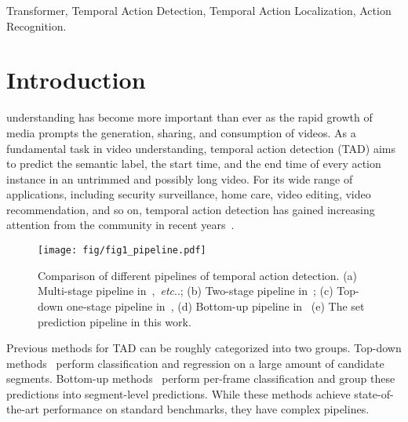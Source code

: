\documentclass[lettersize,journal]{IEEEtran}
\makeatletter
\DeclareRobustCommand\onedot{\futurelet\@let@token\@onedot}
\def\@onedot{\ifx\@let@token.\else.\null\fi\xspace}
\def\etc{\emph{etc}\onedot} \def\vs{\emph{vs}\onedot}
\makeatother
\begin{document}
\begin{IEEEkeywords}
Transformer, Temporal Action Detection, Temporal Action Localization, Action Recognition.
\end{IEEEkeywords}

\section{Introduction}
 understanding has become more important than ever as the rapid growth of media prompts the generation, sharing, and consumption of videos. As a fundamental task in video understanding, temporal action detection (TAD) aims to predict the semantic label, the start time, and the end time of every action instance in an untrimmed and possibly long video. For its wide range of applications, including security surveillance, home care, video editing, video recommendation, and so on, temporal action detection has gained increasing attention from the community in recent years~\cite{shou2016temporal,xu2020g,Ma_2016_CVPR,richard2016temporal,caba2016fast}.

\begin{figure}
    \centering
    \texttt{[image: fig/fig1\_pipeline.pdf]}
    \caption{
    Comparison of different pipelines of temporal action detection. (a) Multi-stage pipeline in~\protect\cite{shou2016temporal,xu2020g},~\etc; (b) Two-stage pipeline in~\protect\cite{xu2017r,chao2018rethinking}; (c) Top-down one-stage pipeline in~\protect\cite{lin2017single}, (d) Bottom-up  pipeline in~\protect\cite{yuan2017temporal} (e) The set prediction pipeline in this work.}
    \label{fig:pipeline_compare}
\end{figure}

Previous methods for TAD can be roughly categorized into two groups. Top-down methods~\cite{shou2016temporal,zhao2017temporal,lin2019bmn} perform classification and regression on a large amount of  candidate segments. Bottom-up methods~\cite{yuan2017temporal,lea2017temporal} perform per-frame classification and group these predictions into segment-level predictions. While these methods achieve state-of-the-art performance on standard benchmarks, they  
have complex pipelines.
\end{document}
